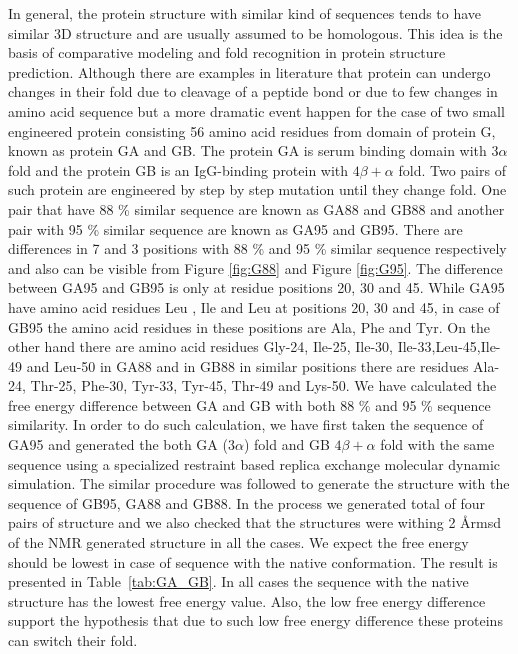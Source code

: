 \documentclass[12pt]{article}
\begin{document}
In general, the protein structure with similar kind of sequences tends to have similar 3D structure and are usually assumed to be 
homologous. This idea is the basis of comparative modeling and fold recognition in protein structure prediction.
Although there are examples in literature that protein can undergo changes in their fold due to cleavage of a peptide bond 
or due to few changes in amino acid sequence but a more dramatic event happen for the case of two small engineered protein 
consisting 56 amino acid residues from domain of
protein G, known as protein GA and GB. The protein GA is serum binding domain with $3 \alpha$ fold and the protein GB is an 
IgG-binding protein with $4 \beta + \alpha$ fold. Two pairs of such protein are engineered by step by step mutation until they 
change fold. One pair that have 88 \% similar sequence are known as GA88 and GB88 and another pair with 95 \% similar sequence 
are known as GA95 and GB95. There are differences in 7 and 3 positions with 88 \% and 95 \% similar sequence respectively and also can 
be visible from Figure \ref{fig:G88} and Figure \ref{fig:G95}. The difference between GA95 and GB95 is only at residue positions 20, 
30 and 45. While GA95 have amino acid residues Leu , Ile and Leu at positions 20, 30 and 45, in case of GB95 the amino acid residues in
these positions are Ala, Phe and Tyr. On the other hand there are amino acid residues Gly-24, Ile-25, Ile-30, Ile-33,Leu-45,Ile-49 and 
Leu-50 in GA88 and in GB88 in similar positions there are residues Ala-24, Thr-25, Phe-30, Tyr-33, Tyr-45, Thr-49 and Lys-50. 
We have calculated the free energy difference between GA and GB with 
both 88 \% and 95 \% sequence similarity. In order to do such calculation, we have first taken the sequence of GA95 and generated the both 
GA ($3 \alpha$) fold and GB $4 \beta + \alpha$ fold with the same sequence using a specialized restraint based replica exchange 
molecular dynamic simulation. The similar procedure was followed to generate the structure with the sequence of GB95, GA88 and GB88.
In the process we generated total of four pairs of structure and we also checked that the structures were withing 2 \AA rmsd of the
NMR generated structure in all the cases. We expect the free energy should be lowest in case of sequence with the native 
conformation. The result is presented in Table~\protect\ref{tab:GA_GB}.  
In all cases the sequence with the native structure has the lowest free energy value. Also, the low free energy difference support
the hypothesis that due to such low free energy difference these proteins can switch their fold.       
      
\end{document}
